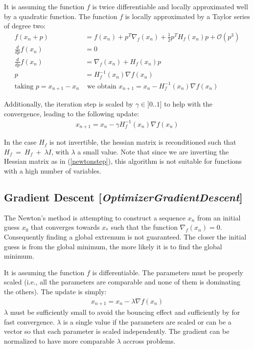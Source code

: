 \documentclass[11pt]{article}
\newcommand{\bigO}{\mathcal{O}}
\newcommand{\nllref}[1]{[\small{\textit{#1}}]}
\begin{document}
It is assuming the function $f$ is twice differentiable and locally approximated well by a quadratic function. The function $f$ is locally approximated by a Taylor series of degree two:
\begin{align}
f(x_n + p)&= f(x_n) + p^T \nabla_f(x_n) + \frac{1}{2} p^T H_f(x_n) p + \bigO(p^3) \nonumber\\
\frac{d}{dp}f(x_n) &= 0 \nonumber\\
\frac{d}{dp}f(x_n) &=\nabla_f(x_n) + H_f(x_n) p \nonumber\\
p &= H_f^{-1}(x_n) \nabla{f}(x_n) \nonumber\\
\text{taking~} p = x_{n+1} - x_n \nonumber
&\text{~we obtain~} x_{n+1} = x_n - H_f^{-1}(x_n) \nabla{f}(x_n)
\end{align}

Additionally, the iteration step is scaled by $\gamma \in ]0..1]$ to help with the convergence, leading to the following update:
\begin{align}
x_{n+1} = x_n - \gamma H_f^{-1}(x_n) \nabla{f}(x_n) \label{newtonstep}
\end{align}

In the case $H_f$ is not invertible, the hessian matrix is reconditioned such that $H_f~=~H_f~+~\lambda I$, with $\lambda$ a small value. Note that since we are inverting the Hessian matrix as in (\ref{newtonstep}), this algorithm is not suitable for functions with a high number of variables.

\subsection{Gradient Descent \nllref{OptimizerGradientDescent}}
The Newton's method is attempting to construct a sequence $x_n$ from an initial guess $x_0$ that converges towards $x_*$ such that the function $\nabla_f(x_n)=0$. Consequently finding a global extremum is not guaranteed. The closer the initial guess is from the global minimum, the more likely it is to find the global minimum.

It is assuming the function $f$ is differentiable. The parameters must be properly scaled (i.e., all the parameters are comparable and none of them is dominating the others). The update is simply:
\begin{align}
x_{n+1} = x_n - \lambda \nabla{f}(x_n) \label{gradientstep}
\end{align}
$\lambda$ must be sufficiently small to avoid the bouncing effect and sufficiently by for fast convergence. $\lambda$ is a single value if the parameters are scaled or can be a vector so that each parameter is scaled independently. The gradient can be normalized to have more comparable $\lambda$ accross problems.
\end{document}
